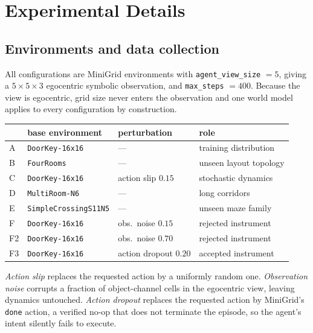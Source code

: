 \section{Experimental Details}
\label{app:details}

\subsection{Environments and data collection}

All configurations are MiniGrid environments \citep{chevalier2023minigrid} with
\texttt{agent\_view\_size} $=5$, giving a $5\times5\times3$ egocentric symbolic observation, and
\texttt{max\_steps} $=400$. Because the view is egocentric, grid size never enters the
observation and one world model applies to every configuration by construction.

\begin{center}\small
\begin{tabular}{llll}
\toprule
& base environment & perturbation & role \\
\midrule
A  & \texttt{DoorKey-16x16}        & ---                       & training distribution \\
B  & \texttt{FourRooms}            & ---                       & unseen layout topology \\
C  & \texttt{DoorKey-16x16}        & action slip $0.15$        & stochastic dynamics \\
D  & \texttt{MultiRoom-N6}         & ---                       & long corridors \\
E  & \texttt{SimpleCrossingS11N5}  & ---                       & unseen maze family \\
F  & \texttt{DoorKey-16x16}        & obs.\ noise $0.15$        & rejected instrument \\
F2 & \texttt{DoorKey-16x16}        & obs.\ noise $0.70$        & rejected instrument \\
F3 & \texttt{DoorKey-16x16}        & action dropout $0.20$     & accepted instrument \\
\bottomrule
\end{tabular}
\end{center}

\emph{Action slip} replaces the requested action by a uniformly random one. \emph{Observation
noise} corrupts a fraction of object-channel cells in the egocentric view, leaving dynamics
untouched. \emph{Action dropout} replaces the requested action by MiniGrid's \texttt{done}
action, a verified no-op that does not terminate the episode, so the agent's intent silently
fails to execute.

